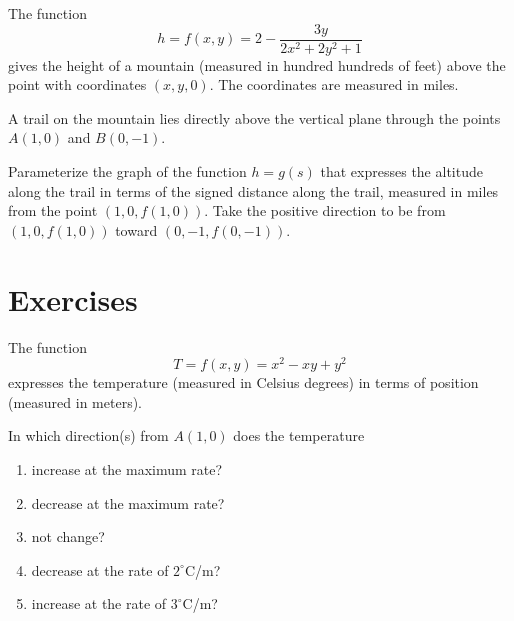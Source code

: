 \documentclass{ximera}
\begin{document}
\begin{exploration}  \label{Edddd33332}
The function
\[
     h = f(x,y) = 2 - \frac{3y}{2x^2+2y^2+1}
\]
gives the height of a mountain (measured in hundred hundreds of feet) above the point with coordinates $(x,y,0)$. The coordinates are measured in miles.

A trail on the mountain lies directly above the vertical plane through the points $A(1,0)$ and $B(0,-1)$.

Parameterize the graph of the function $h=g(s)$ that expresses the altitude along the trail in terms of the signed distance along the trail, measured in miles from the point $(1,0,f(1,0))$. Take the positive direction to be from $(1,0,f(1,0))$ toward $(0,-1,f(0,-1))$. 


\end{exploration}


\section{Exercises}

\begin{question} \label{Q545345ggt55}
The function
\[
     T = f(x,y) = x^2 - xy + y^2  
\]
expresses the temperature (measured in Celsius degrees) in terms of position (measured in meters).

In which direction(s) from $A(1,0)$ does the temperature
\begin{enumerate}
\item increase at the maximum rate?

\item decrease at the maximum rate?

\item not change?

\item decrease at the rate of $2^\circ$C/m?

\item increase at the rate of $3^\circ$C/m?
\end{enumerate}

\end{question}
\end{document}
